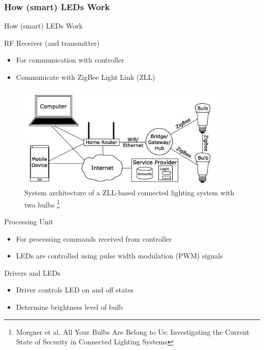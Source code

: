 \documentclass[11pt,t,usepdftitle=false,aspectratio=169]{beamer}
\begin{document}
\subsubsection{How (smart) LEDs Work}%
\label{sub:how_smart_leds_work}
% 
\begin{frame}{How (smart) LEDs Work}
     {
        \begin{block}{RF Receiver (and transmitter)}
            \begin{itemize}
                \item For communication with controller
                \item Communicate with ZigBee Light Link (ZLL)
            \end{itemize}
        \end{block}
    }
     {
         \begin{figure}
            \centering
            \includegraphics[height=5cm,keepaspectratio]{img/ZLL.JPG}
            \caption{\small{System architecture of a ZLL-based connected lighting system with two bulbs} \footnote{\tiny{Morgner et al. All Your Bulbs Are Belong to Us: Investigating the Current State of Security in Connected Lighting Systems}}}
         \end{figure}
    }
     {
        \begin{block}{Processing Unit}
            \begin{itemize}
                \item For processing commands received from controller
                \item LEDs are controlled using pulse width modulation (PWM) signals
            \end{itemize}
        \end{block}
        
        \begin{block}{Drivers and LEDs}
            \begin{itemize}
                \item Driver controls LED on and off states
                \item Determine brightness level of bulb
            \end{itemize}
        \end{block}
    }
     {
         
}
\end{frame}
\end{document}
